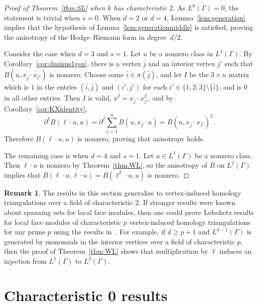 \documentclass[11pt]{article}
\theoremstyle{definition}
\newtheorem{rema}[theo]{Remark}
\numberwithin{equation}{section}
\numberwithin{equation}{section}
\begin{document}
\begin{proof}[Proof of Theorem~\ref{thm:SL} when $k$ has characteristic $2$]
As $L^0(\Gamma) = 0$, the statement is trivial when $s=0$. 
When $d = 2$ or $d=4$, Lemma~\ref{lem:generation} implies that the hypothesis of Lemma~\ref{lem:generationmiddle} is satisfied, proving the anisotropy of the Hodge--Riemann form in degree~$d/2$. 

Consider the case when $d=3$ and $s=1$. Let $u$ be a nonzero class in $L^1(\Gamma)$. By Corollary~\ref{cor:dminus1gen}, there is a vertex $\bar{j}$ and an interior vertex $j'$ such that $B(u,  x_{\bar{j}} \cdot x_{j'} )$ is nonzero. Choose some $\bar{i} \in \sigma(\bar{j})$, and let $I$ be the $3 \times n$ matrix which is $1$ in the entries $(\bar{i}, \bar{j})$ and $(i', j')$ for each $i' \in \{1, 2, 3\} \setminus \{\bar{i}\}$, and is $0$ in all other entries. Then $I$ is valid, $x^I = x_{\bar{j}} \cdot x_{j'}^2$, and by Corollary~\ref{cor:KXidentity},
$$\partial^I B(\ell \cdot u, u) = \partial^I \sum_{j=1}^{n} B(u, x_j \cdot u) = B(u, x_{\bar{j}} \cdot x_{j'})^2.$$
Therefore $B(\ell \cdot u, u)$ is nonzero, proving that anisotropy holds. 

The remaining case is when $d=4$ and $s=1$. Let $u \in L^1(\Gamma)$ be a nonzero class. Then $\ell \cdot u$ is nonzero by Theorem~\ref{thm:WL}, so the anisotropy of $B$ on $L^2(\Gamma)$ implies that $B(\ell \cdot u, \ell \cdot u) = B(\ell^2 \cdot u, u)$ is nonzero. 
\end{proof}

\begin{rema}\label{rem:homologylefschetz}
The results in this section generalize to vertex-induced homology triangulations over a field of characteristic $2$. If stronger results were known about spanning sets for local face modules, then one could prove Lefschetz results for local face modules of characteristic $p$ vertex-induced homology triangulations for any prime $p$ using the results in~\cite{KLS}. For example, if $d \ge p+1$ and $L^{d-1}(\Gamma)$ is generated by monomials in the interior vertices over a field of characteristic $p$, then the proof of Theorem~\ref{thm:WL} shows that multiplication by $\ell$ induces an injection from $L^1(\Gamma)$ to $L^2(\Gamma)$. 
\end{rema}

\section{Characteristic 0 results}\label{sec:char0}
\end{document}
